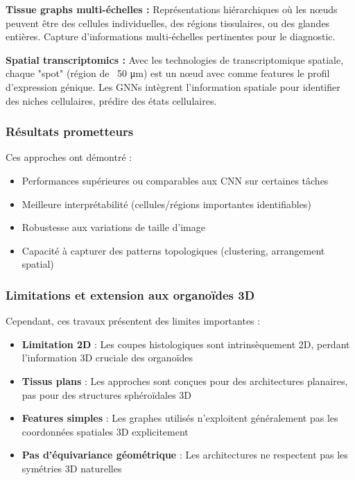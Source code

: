 \textbf{Tissue graphs multi-échelles :}
Représentations hiérarchiques où les nœuds peuvent être des cellules individuelles, des régions tissulaires, ou des glandes entières. Capture d'informations multi-échelles pertinentes pour le diagnostic.

\textbf{Spatial transcriptomics :}
Avec les technologies de transcriptomique spatiale, chaque "spot" (région de ~50 μm) est un nœud avec comme features le profil d'expression génique. Les GNNs intègrent l'information spatiale pour identifier des niches cellulaires, prédire des états cellulaires.

\subsubsection{Résultats prometteurs}

Ces approches ont démontré :
\begin{itemize}
    \item Performances supérieures ou comparables aux CNN sur certaines tâches
    \item Meilleure interprétabilité (cellules/régions importantes identifiables)
    \item Robustesse aux variations de taille d'image
    \item Capacité à capturer des patterns topologiques (clustering, arrangement spatial)
\end{itemize}

\subsubsection{Limitations et extension aux organoïdes 3D}

Cependant, ces travaux présentent des limites importantes :
\begin{itemize}
    \item \textbf{Limitation 2D} : Les coupes histologiques sont intrinsèquement 2D, perdant l'information 3D cruciale des organoïdes
    \item \textbf{Tissus plans} : Les approches sont conçues pour des architectures planaires, pas pour des structures sphéroïdales 3D
    \item \textbf{Features simples} : Les graphes utilisés n'exploitent généralement pas les coordonnées spatiales 3D explicitement
    \item \textbf{Pas d'équivariance géométrique} : Les architectures ne respectent pas les symétries 3D naturelles
\end{itemize}

